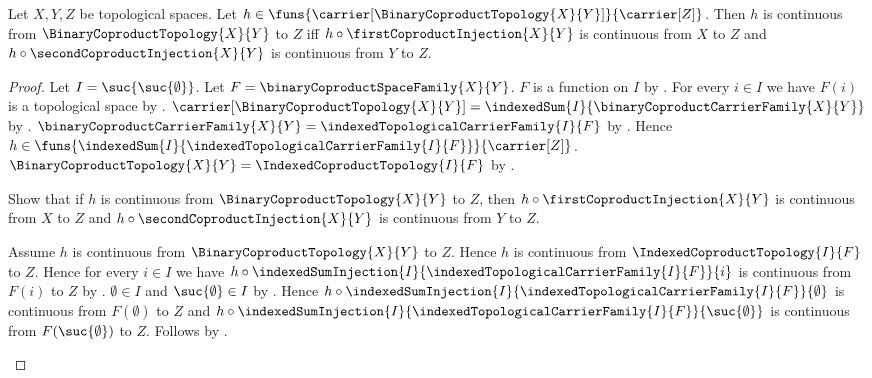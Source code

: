 \begin{theorem}\label{binary_coproduct_topology_universal_property}
    Let $X,Y,Z$ be topological spaces.
    Let $h\in\funs{\carrier[\BinaryCoproductTopology{X}{Y}]}{
        \carrier[Z]}$.
    Then $h$ is continuous from $\BinaryCoproductTopology{X}{Y}$ to $Z$
        iff $h\circ\firstCoproductInjection{X}{Y}$ is continuous from
            $X$ to $Z$ and
            $h\circ\secondCoproductInjection{X}{Y}$ is continuous from
            $Y$ to $Z$.
\end{theorem}
\begin{proof}
    Let $I=\suc{\suc{\emptyset}}$.
    Let $F=\binaryCoproductSpaceFamily{X}{Y}$.
    $F$ is a function on $I$ by
        .
    For every $i\in I$ we have $F(i)$ is a topological space by
        .
    $\carrier[\BinaryCoproductTopology{X}{Y}]
        =\indexedSum{I}{\binaryCoproductCarrierFamily{X}{Y}}$ by
        .
    $\binaryCoproductCarrierFamily{X}{Y}
        =\indexedTopologicalCarrierFamily{I}{F}$ by
        .
    Hence $h\in\funs{
        \indexedSum{I}{\indexedTopologicalCarrierFamily{I}{F}}}{
        \carrier[Z]}$.
    $\BinaryCoproductTopology{X}{Y}
        =\IndexedCoproductTopology{I}{F}$ by
        .

    Show that if $h$ is continuous from
        $\BinaryCoproductTopology{X}{Y}$ to $Z$, then
        $h\circ\firstCoproductInjection{X}{Y}$ is continuous from
            $X$ to $Z$ and
        $h\circ\secondCoproductInjection{X}{Y}$ is continuous from
            $Y$ to $Z$.
    \begin{subproof}
        Assume $h$ is continuous from
            $\BinaryCoproductTopology{X}{Y}$ to $Z$.
        Hence $h$ is continuous from $\IndexedCoproductTopology{I}{F}$
            to $Z$.
        Hence for every $i\in I$ we have
            $h\circ\indexedSumInjection{I}{
                \indexedTopologicalCarrierFamily{I}{F}}{i}$
            is continuous from $F(i)$ to $Z$ by
            .
        $\emptyset\in I$ and $\suc{\emptyset}\in I$ by
            .
        Hence $h\circ\indexedSumInjection{I}{
            \indexedTopologicalCarrierFamily{I}{F}}{\emptyset}$
            is continuous from $F(\emptyset)$ to $Z$ and
            $h\circ\indexedSumInjection{I}{
                \indexedTopologicalCarrierFamily{I}{F}}{
                \suc{\emptyset}}$
            is continuous from $F(\suc{\emptyset})$ to $Z$.
        Follows by
            .
    \end{subproof}


\end{proof}
